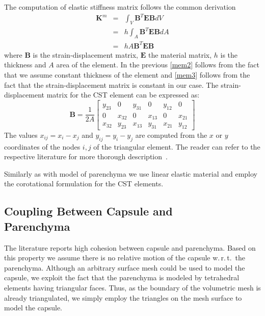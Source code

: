 \documentclass{acm_proc_article-sp}
\def\wrt{w.\,r.\,t.}
\newcommand{\Mat}[1]{\mathbf{#1}}
\begin{document}
The computation of elastic stiffness matrix follows the common derivation
%
\begin{eqnarray}
  \Mat{K}^m & = & \int_V \Mat{B}^T \Mat{E} \Mat{B} dV     \label{mem1} \\
            & = & h \int_A \Mat{B}^T \Mat{E} \Mat{B} dA   \label{mem2} \\
            & = & h A \Mat{B}^T \Mat{E} \Mat{B}           \label{mem3}
\end{eqnarray}
%
where $\Mat{B}$ is the strain-displacement matrix, $\Mat{E}$ the material
matrix, $h$ is the thickness and $A$ area of the element. In the previous
\eqref{mem2} follows from the fact that we assume constant thickness of the
element and \eqref{mem3} follows from the fact that the strain-displacement
matrix is constant in our case. The strain-displacement matrix for the CST
element can be expressed as:
%
\begin{equation}
  \Mat{B} = \frac{1}{2A} \begin{bmatrix}
    y_{23} & 0      & y_{31} & 0      & y_{12} & 0 \\
         0 & x_{32} & 0      & x_{13} & 0      & x_{21} \\
    x_{32} & y_{23} & x_{13} & y_{31} & x_{21} & y_{12}
  \end{bmatrix}
\end{equation}
%
The values $x_{ij} = x_i - x_j$ and $y_{ij} = y_i - y_j$ are computed from
the $x$ or $y$ coordinates of the nodes $i,j$ of the triangular element.
The reader can refer to the respective literature for more thorough
description~\cite{Felippa2003}.

Similarly as with model of parenchyma we use linear elastic material and employ
the corotational formulation for the CST elements.


\subsection{Coupling Between Capsule and\\Parenchyma} %
The literature reports high cohesion between capsule and parenchyma.
Based on this property we assume there is no relative motion of the capsule \wrt\ the parenchyma.
Although an arbitrary surface mesh could be used to model the capsule, we exploit 
the fact that the parenchyma is modeled by tetrahedral elements having
triangular faces. Thus, as the boundary of the volumetric mesh is already
triangulated, we simply employ the triangles on the mesh surface to model the capsule.
\end{document}

